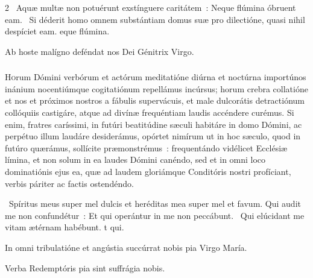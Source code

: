\documentclass[9pt,twoside]{extarticle}
\begin{document}
\begin{multicols}{2}
\smallskip
{}~Aquæ multæ non potuérunt exstínguere caritátem~: \textred{*} Neque flúmina óbruent eam. ~Si déderit homo omnem substántiam domus suæ pro dilectióne, quasi nihil despíciet eam. eque flúmina.

\smallskip
\small {} Ab hoste malígno deféndat nos Dei Génitrix Virgo.

\normalsize
\subsubsection*{\center \normalfont {}}
\lettrine{H}{o}rum Dómini verbórum et actórum meditatióne diúrna et noctúrna importúnos inánium nocentiúmque cogitatiónum repellámus incúrsus; horum crebra collatióne et nos et próximos nostros a fábulis supervácuis, et male dulcorátis detractiónum collóquiis castigáre, atque ad divínæ frequéntiam laudis accéndere curémus.
Si enim, fratres caríssimi, in futúri beatitúdine sæculi habitáre in domo Dómini, ac perpétuo illum laudáre desiderámus, opórtet nimírum ut in hoc sæculo, quod in futúro quærámus, sollícite præmonstrémus~: frequentándo vidélicet Ecclésiæ límina, et non solum in ea laudes Dómini canéndo, sed et in omni loco dominatiónis ejus ea, quæ ad laudem gloriámque Conditóris nostri profíciant, verbis páriter ac factis ostendéndo.

\smallskip
{}~Spíritus meus super mel dulcis et heréditas mea super mel et favum. Qui audit me non confundétur~: \textred{*} Et qui operántur in me non peccábunt. ~Qui elúcidant me vitam ætérnam habébunt. t qui.

\smallskip
\small {} In omni tribulatióne et angústia succúrrat nobis pia Virgo María.

 Verba Redemptóris pia sint suffrágia nobis. \normalsize


\end{multicols}
\end{document}
